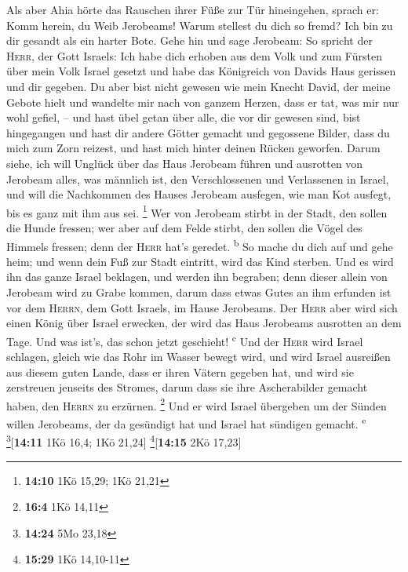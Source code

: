  Als aber Ahia hörte das Rauschen ihrer Füße zur Tür
hineingehen, sprach er: Komm herein, du Weib Jerobeams! Warum stellest
du dich so fremd? Ich bin zu dir gesandt als ein harter Bote.
 Gehe hin und sage Jerobeam: So spricht der \textsc{Herr},
der Gott Israels: Ich habe dich erhoben aus dem Volk und zum Fürsten
über mein Volk Israel gesetzt  und habe das Königreich von
Davids Haus gerissen und dir gegeben. Du aber bist nicht gewesen wie
mein Knecht David, der meine Gebote hielt und wandelte mir nach von
ganzem Herzen, dass er tat, was mir nur wohl gefiel, -- 
und hast übel getan über alle, die vor dir gewesen sind, bist
hingegangen und hast dir andere Götter gemacht und gegossene Bilder,
dass du mich zum Zorn reizest, und hast mich hinter deinen Rücken
geworfen.  Darum siehe, ich will Unglück über das Haus
Jerobeam führen und ausrotten von Jerobeam alles, was männlich ist, den
Verschlossenen und Verlassenen in Israel, und will die Nachkommen des
Hauses Jerobeam ausfegen, wie man Kot ausfegt, bis es ganz mit ihm aus
sei. \footnote{\textbf{14:10} 1Kö 15,29; 1Kö 21,21}  Wer
von Jerobeam stirbt in der Stadt, den sollen die Hunde fressen; wer aber
auf dem Felde stirbt, den sollen die Vögel des Himmels fressen; denn der
\textsc{Herr} hat's geredet. \textsuperscript{b}  So
mache du dich auf und gehe heim; und wenn dein Fuß zur Stadt eintritt,
wird das Kind sterben.  Und es wird ihn das ganze Israel
beklagen, und werden ihn begraben; denn dieser allein von Jerobeam wird
zu Grabe kommen, darum dass etwas Gutes an ihm erfunden ist vor dem
\textsc{Herrn}, dem Gott Israels, im Hause Jerobeams. 
Der \textsc{Herr} aber wird sich einen König über Israel erwecken, der
wird das Haus Jerobeams ausrotten an dem Tage. Und was ist's, das schon
jetzt geschieht! \textsuperscript{c}  Und der
\textsc{Herr} wird Israel schlagen, gleich wie das Rohr im Wasser bewegt
wird, und wird Israel ausreißen aus diesem guten Lande, dass er ihren
Vätern gegeben hat, und wird sie zerstreuen jenseits des Stromes, darum
dass sie ihre Ascherabilder gemacht haben, den \textsc{Herrn} zu
erzürnen. \footnote{\textbf{16:4} 1Kö 14,11}  Und er wird
Israel übergeben um der Sünden willen Jerobeams, der da gesündigt hat
und Israel hat sündigen gemacht. \textsuperscript{e}
\footnote{\textbf{14:24} 5Mo 23,18}{[}\textbf{14:11} 1Kö 16,4; 1Kö
21,24{]} \footnote{\textbf{15:29} 1Kö 14,10-11}{[}\textbf{14:15} 2Kö
17,23{]}

